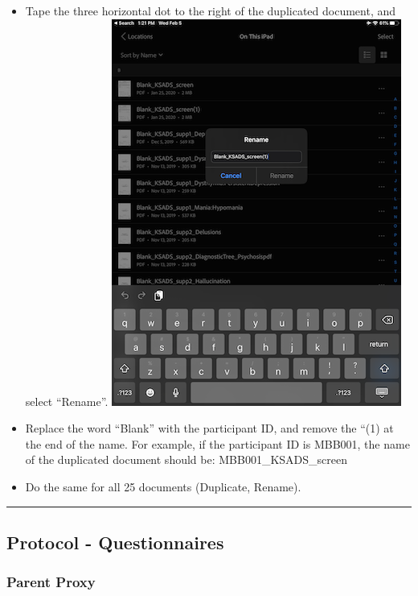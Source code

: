 \documentclass[]{book}
\begin{document}
\begin{itemize}
\begin{itemize}
  \item
    Tape the three horizontal dot to the right of the duplicated document, and select ``Rename''.
    \includegraphics{images/ksads/6.png}
  \item
    Replace the word ``Blank'' with the participant ID, and remove the ``(1) at the end of the name. For example, if the participant ID is MBB001, the name of the duplicated document should be: MBB001\_KSADS\_screen
  \item
    Do the same for all 25 documents (Duplicate, Rename).
  \end{itemize}
\end{itemize}

\begin{center}\rule{0.5\linewidth}{0.5pt}\end{center}

\hypertarget{protocol---questionnaires}{%
\subsection{Protocol - Questionnaires}\label{protocol---questionnaires}}

\hypertarget{parent-proxy}{%
\subsubsection{Parent Proxy}\label{parent-proxy}}
\end{document}
